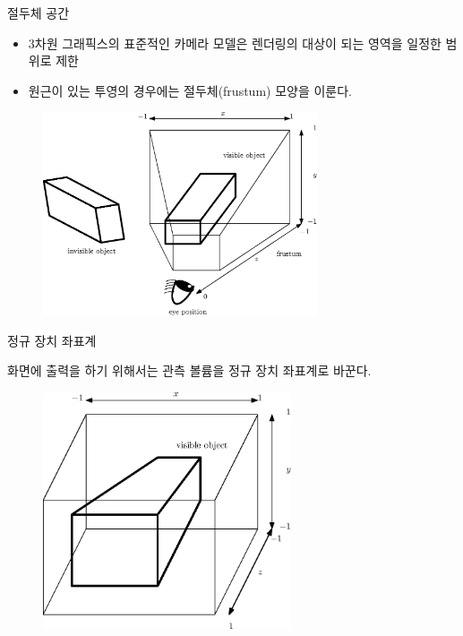 \documentclass{beamer}
\begin{document}
\begin{frame}[fragile]{절두체 공간}

\begin{itemize}
\item 3차원 그래픽스의 표준적인 카메라 모델은 렌더링의 대상이 되는 영역을 일정한 범위로 제한
\item 원근이 있는 투영의 경우에는 절두체(frustum) 모양을 이룬다.
\end{itemize}

\begin{figure}[h!]
  \centering
    \includegraphics[height=6cm]{OGL_camera/frustumConcept.eps}
\end{figure}

\end{frame}

\begin{frame}[fragile]{정규 장치 좌표계}

화면에 출력을 하기 위해서는 관측 볼륨을 정규 장치 좌표계로 바꾼다.

\begin{figure}[h!]
  \centering
    \includegraphics[height=7cm]{OGL_camera/deviceCoordinate.eps}
\end{figure}

\end{frame}
\end{document}
